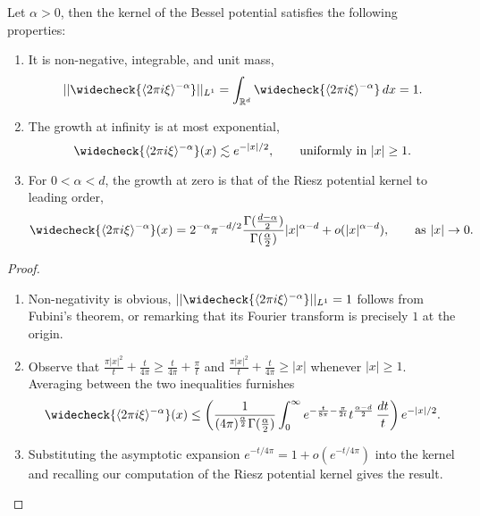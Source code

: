 \begin{proposition}
	Let $\alpha > 0$, then the kernel of the Bessel potential satisfies the following properties: 
	\begin{enumerate}
		\item It is non-negative, integrable, and unit mass,  
			\[ ||\widecheck{\langle 2\pi i \xi \rangle^{-\alpha}}||_{L^1} = \int_{\R^d} \widecheck{\langle 2\pi i \xi \rangle^{-\alpha}} \, dx = 1.  \]
			
		\item The growth at infinity is at most exponential, 
			\[ \widecheck{\langle 2\pi i \xi \rangle^{-\alpha}} (x) \lesssim e^{-|x|/2}, \qquad \text{uniformly in $|x| \geq 1$.} \]
		
		\item For $0 < \alpha < d$, the growth at zero is that of the Riesz potential kernel to leading order, 
			\[
				 \widecheck{\langle 2\pi i \xi \rangle^{-\alpha}} (x)= 2^{-\alpha} \pi^{- d/2} \frac{\Gamma (\frac{d - \alpha}{2})}{\Gamma(\frac{\alpha}{2})} |x|^{\alpha - d} + o(|x|^{\alpha - d}), \qquad \text{as $|x| \to 0$.}
			\] 
	\end{enumerate}
\end{proposition}

\begin{proof}
\leavevmode
\begin{enumerate}
	\item Non-negativity is obvious, $||\widecheck{\langle 2\pi i \xi \rangle^{-\alpha}}||_{L^1} = 1$ follows from Fubini's theorem, or remarking that its Fourier transform is precisely $1$ at the origin. 
	
	\item Observe that $\tfrac{\pi |x|^2}{t} + \tfrac{t}{4\pi} \geq \tfrac{t}{4\pi} + \tfrac\pi t$ and $\tfrac{\pi |x|^2}{t} + \tfrac{t}{4\pi} \geq |x|$ whenever $|x| \geq 1$. Averaging between the two inequalities furnishes 
		\[
			\widecheck{\langle 2\pi i \xi \rangle^{-\alpha}} (x)  \leq \left( \frac{1}{(4\pi)^{\frac\alpha2} \Gamma(\frac\alpha2)} \int_0^\infty  e^{-\frac{t}{8\pi} - \frac{\pi}{2t}}   t^{\frac{\alpha - d}{2}} \, \frac{dt}{t}\right) e^{-|x|/2}.
		\]
	\item Substituting the asymptotic expansion $e^{-t/4\pi} = 1 + o(e^{-t/4\pi})$ into the kernel and recalling our computation of the Riesz potential kernel gives the result. 
\end{enumerate}
\end{proof}

